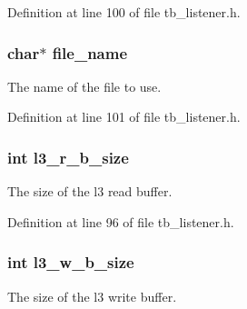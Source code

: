 Definition at line 100 of file tb\-\_\-listener.\-h.

\hypertarget{structtb__test__params__t_a8505c513bc640d1f69e5f76fb32b24a8}{
\subsubsection[{file\-\_\-name}]{\setlength{\rightskip}{0pt plus 5cm}char$\ast$ file\-\_\-name}}\label{structtb__test__params__t_a8505c513bc640d1f69e5f76fb32b24a8}


The name of the file to use. 



Definition at line 101 of file tb\-\_\-listener.\-h.

\hypertarget{structtb__test__params__t_aa9d1ab0c9c6ef33a4b6bd60172dd0ec5}{
\subsubsection[{l3\-\_\-r\-\_\-b\-\_\-size}]{\setlength{\rightskip}{0pt plus 5cm}int l3\-\_\-r\-\_\-b\-\_\-size}}\label{structtb__test__params__t_aa9d1ab0c9c6ef33a4b6bd60172dd0ec5}


The size of the l3 read buffer. 



Definition at line 96 of file tb\-\_\-listener.\-h.

\hypertarget{structtb__test__params__t_aee0e87ac541b0694deb1499aa3371f91}{
\subsubsection[{l3\-\_\-w\-\_\-b\-\_\-size}]{\setlength{\rightskip}{0pt plus 5cm}int l3\-\_\-w\-\_\-b\-\_\-size}}\label{structtb__test__params__t_aee0e87ac541b0694deb1499aa3371f91}


The size of the l3 write buffer. 



